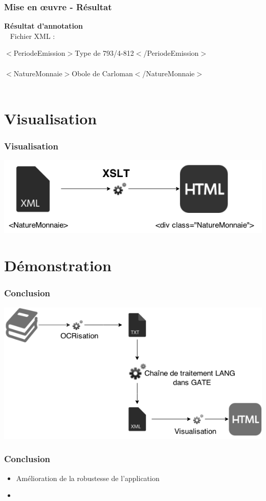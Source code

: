 \documentclass[10pt, compress]{beamer}
\begin{document}
\begin{frame}[fragile]
  \frametitle{Mise en œuvre - Résultat}
\textbf{Résultat d'annotation}\\~
Fichier XML : \\
\begin{center}
\alert{$<$PeriodeEmission$>$}Type de 793/4-812\alert{$<$/PeriodeEmission$>$}\\~\\
\alert{$<$NatureMonnaie$>$}Obole de Carloman\alert{$<$/NatureMonnaie$>$}\\~\\
\end{center}
\hfill{}

\end{frame}
\section{Visualisation}
\begin{frame}[fragile]
  \frametitle{Visualisation}
\begin{center}
\includegraphics[scale=.5]{img/visualisation.png} 
\end{center}
\end{frame}
\section{Démonstration}
\begin{frame}[fragile]
  \frametitle{Conclusion}
\begin{center}
\includegraphics[scale=0.5]{img/conclusion.png}
\end{center}
\end{frame}

\begin{frame}
\frametitle{Conclusion}
\begin{itemize}[<+->]
	[square]
	\item{Amélioration de la robustesse de l'application}
	\item{}
\end{itemize}
\end{frame}
\end{document}
